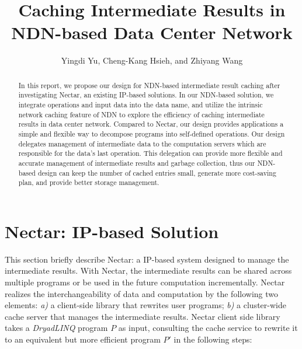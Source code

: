 \documentclass[journal]{IEEEtran}
\begin{document}
\title{Caching Intermediate Results in NDN-based Data Center Network}

\author{Yingdi Yu,
  Cheng-Kang Hsieh,
  and Zhiyang Wang}

\maketitle

\begin{abstract}
In this report, we propose our design for NDN-based intermediate result caching
after investigating Nectar, an existing IP-based solutions.  In our NDN-based
solution, we integrate operations and input data into the data name, and utilize
the intrinsic network caching feature of NDN to explore the efficiency of
caching intermediate results in data center network.  Compared to Nectar, our
design provides applications a simple and flexible way to decompose programs
into self-defined operations.  Our design delegates management of intermediate
data to the computation servers which are responsible for the data's last
operation.  This delegation can provide more flexible and accurate management of
intermediate results and garbage collection, thus our NDN-based design can keep
the number of cached entries small, generate more cost-saving plan, and provide
better storage management.
\end{abstract}

\section{Nectar: IP-based Solution}
This section
briefly describe Nectar: a IP-based system designed to manage the intermediate
results. With Nectar, the intermediate results can be shared across multiple
programs or be used in the future computation incrementally.  Nectar realizes
the interchangeability of data and computation by the following two elements:
\emph{a)} a client-side library that rewrites user programs; \emph{b)} a
cluster-wide cache server that manages the intermediate results.  Nectar client
side library takes a \emph{DryadLINQ} program $P$ as input, consulting the
cache service to rewrite it to an equivalent but more efficient program $P'$ in
the following steps:
\end{document}

